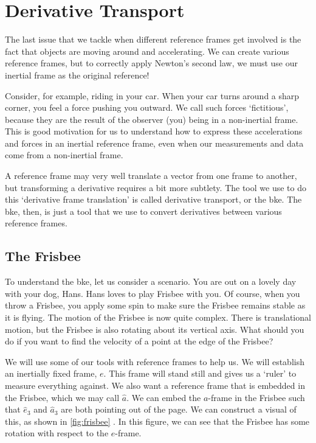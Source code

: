 \documentclass[10pt, openany, titlepage]{book}
\theoremstyle{definition}
\newcounter{example}[chapter]
\let\oldautoref\autoref
\renewcommand{\autoref}[1]{%
  \begingroup
  \hypersetup{linkcolor=black}%
  \oldautoref{#1}%
  \endgroup
}
\begin{document}
\section{Derivative Transport}
The last issue that we tackle when different reference frames get involved is the fact that objects are moving around and accelerating. We can create various reference frames, but to correctly apply Newton's second law, we must use our inertial frame as the original reference!

Consider, for example, riding in your car. When your car turns around a sharp corner, you feel a force pushing you outward. We call such forces `fictitious', because they are the result of the observer (you) being in a non-inertial frame. This is good motivation for us to understand how to express these accelerations and forces in an inertial reference frame, even when our measurements and data come from a non-inertial frame.

A reference frame may very well translate a vector from one frame to another, but transforming a derivative requires a bit more subtlety.  The tool we use to do this `derivative frame translation' is called derivative transport, or the \gls{bke}. The \gls{bke}, then, is just a tool that we use to convert derivatives between various reference frames.

\subsection{The Frisbee}
    To understand the \gls{bke}, let us consider a scenario. You are out on a lovely day with your dog, Hans. Hans loves to play Frisbee with you. Of course, when you throw a Frisbee, you apply some spin to make sure the Frisbee remains stable as it is flying. The motion of the Frisbee is now quite complex. There is translational motion, but the Frisbee is also rotating about its vertical axis. What should you do if you want to find the velocity of a point at the edge of the Frisbee?

    We will use some of our tools with reference frames to help us. We will establish an inertially fixed frame, $e$. This frame will stand still and gives us a `ruler' to measure everything against. We also want a reference frame that is embedded in the Frisbee, which we may call $\hat{a}$. We can embed the $a$-frame in the Frisbee such that $\hat{e}_3$ and $\hat{a}_3$ are both pointing out of the page. We can construct a visual of this, as shown in \autoref{fig:frisbee}. In this figure, we can see that the Frisbee has some rotation with respect to the $e$-frame.
\end{document}
